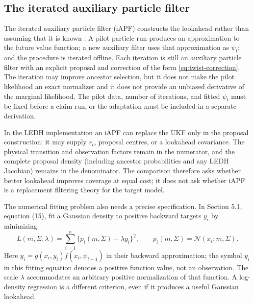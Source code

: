 \documentclass[11pt]{article}
\begin{document}
\subsection{The iterated auxiliary particle filter}

The iterated auxiliary particle filter (iAPF) constructs the lookahead rather
than assuming that it is known \citep{guarniero2017iapf}. A pilot particle run
produces an approximation to the future value function; a new auxiliary filter
uses that approximation as $\psi_t$; and the procedure is iterated offline.
Each iteration is still an auxiliary particle filter with an explicit proposal
and correction of the form \eqref{eq:twist-correction}. The iteration may
improve ancestor selection, but it does not make the pilot likelihood an exact
normalizer and it does not provide an unbiased derivative of the marginal
likelihood. The pilot data, number of iterations, and fitted $\psi_t$ must be
fixed before a claim run, or the adaptation must be included in a separate
derivation.

In the LEDH implementation an iAPF can replace the UKF only in the proposal
construction: it may supply $r_t$, proposal centres, or a lookahead covariance.
The physical transition and observation factors remain in the numerator, and
the complete proposal density (including ancestor probabilities and any LEDH
Jacobian) remains in the denominator. The comparison therefore asks whether
better lookahead improves coverage at equal cost; it does not ask whether iAPF
is a replacement filtering theory for the target model.

The numerical fitting problem also needs a precise specification. In
Section 5.1, equation (15), \citet{guarniero2017iapf} fit a Gaussian density
to positive backward targets $y_i$ by minimizing
\begin{equation}
 L(m,\Sigma,\lambda)
   =\sum_{i=1}^n\{p_i(m,\Sigma)-\lambda y_i\}^2,
 \qquad p_i(m,\Sigma)=\mathcal N(x_i;m,\Sigma).
 \label{eq:iapf-density-fit}
\end{equation}
Here $y_i=g(x_i,y_t)f(x_i,\psi_{t+1})$ in their backward approximation;
the symbol $y_i$ in this fitting equation denotes a positive function value,
not an observation. The scale $\lambda$ accommodates an arbitrary positive
normalization of that function. A log-density regression is a different
criterion, even if it produces a useful Gaussian lookahead.
\end{document}
